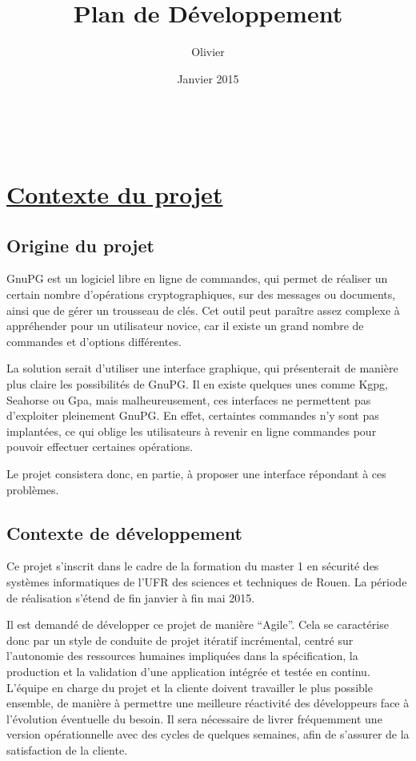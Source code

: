 \documentclass{../res/univ-projet}
\title{Plan de Développement}
\author{Olivier \bsc{Thibault}}
\date{Janvier 2015}
\begin{document}
\maketitle
\newpage
~
\tableofcontents
\newpage

\section{\underline{Contexte du projet}}

\subsection{Origine du projet}

GnuPG est un logiciel libre en ligne de commandes, qui permet de réaliser un certain nombre d'opérations cryptographiques, sur des messages ou 
documents, ainsi que de gérer un trousseau de clés. Cet outil peut paraître assez complexe à appréhender pour un utilisateur novice, 
car il existe un grand nombre de commandes et d'options différentes. 

La solution serait d'utiliser une interface graphique, qui présenterait de manière plus claire les possibilités de GnuPG. Il en existe quelques 
unes comme Kgpg, Seahorse ou Gpa, mais malheureusement, ces interfaces ne permettent pas d'exploiter pleinement GnuPG. En effet, certaintes 
commandes n'y sont pas implantées, ce qui oblige les utilisateurs à revenir en ligne commandes pour pouvoir effectuer certaines opérations. 

Le projet consistera donc, en partie, à proposer une interface répondant à ces problèmes.

\subsection{Contexte de développement}

Ce projet s'inscrit dans le cadre de la formation du master 1 en sécurité des systèmes informatiques de l'UFR des sciences et techniques de Rouen. 
La période de réalisation s'étend de fin janvier à fin mai 2015. 

Il est demandé de développer ce projet de manière ``Agile''. Cela se caractérise donc par un style de conduite de projet itératif incrémental, 
centré sur l’autonomie des ressources humaines impliquées dans la spécification, la production et la validation d’une application intégrée et 
testée en continu. L'équipe en charge du projet et la cliente doivent travailler le plus possible ensemble, de manière à permettre une meilleure 
réactivité des développeurs face à l'évolution éventuelle du besoin. Il sera nécessaire de livrer fréquemment une version opérationnelle avec 
des cycles de quelques semaines, afin de s'assurer de la satisfaction de la cliente.
\end{document}
